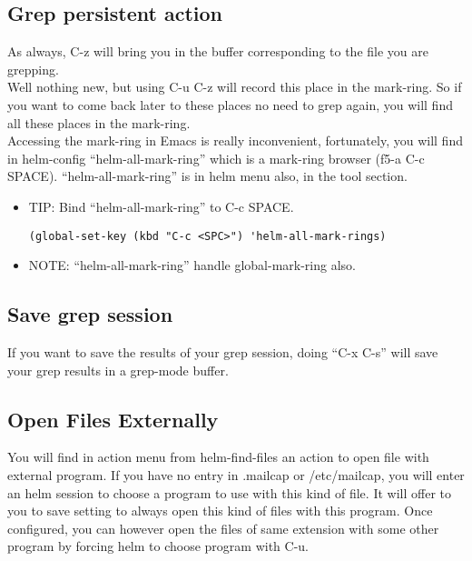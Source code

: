 \documentclass[a4paper,11pt]{article}
\begin{document}
\subsection{Grep persistent action}
\label{sec:grep-pers-acti}
As always, C-z will bring you in the buffer corresponding to the file you are grepping. \\
Well nothing new, but using C-u C-z will record this place in the mark-ring.
So if you want to come back later to these places no need to grep again, you will find all these 
places in the mark-ring.\\
Accessing the mark-ring in Emacs is really inconvenient, fortunately, you will find in helm-config 
``helm-all-mark-ring'' which is a mark-ring browser (f5-a C-c SPACE).
\newpage
``helm-all-mark-ring'' is in helm menu also, in the tool section.\\

\begin{itemize}
\item TIP: Bind ``helm-all-mark-ring'' to C-c SPACE.
\begin{verbatim}
(global-set-key (kbd "C-c <SPC>") 'helm-all-mark-rings)
\end{verbatim}
\end{itemize}

\begin{itemize}
\item NOTE: ``helm-all-mark-ring'' handle global-mark-ring also.
\end{itemize}

\subsection{Save grep session}
\label{sec:save-grep-session}
If you want to save the results of your grep session, doing ``C-x C-s'' will save your grep results
in a grep-mode buffer. 

\subsection{Open Files Externally}
\label{sec:open-files-extern}
You will find in action menu from helm-find-files an action to open file with external program.
If you have no entry in .mailcap or /etc/mailcap, you will enter an helm session to choose a program
to use with this kind of file.
It will offer to you to save setting to always open this kind of files with this program.
Once configured, you can however open the files of same extension with some other program by forcing helm
to choose program with C-u.\\
\end{document}
